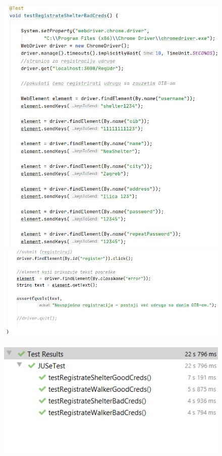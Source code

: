 			 \begin{figure}[H]
			 	\includegraphics[scale=0.75]{slike/Selenium4.1.PNG}
			 	\hspace*{0.1in}
			 	\includegraphics[scale=0.75]{slike/Selenium4.2.PNG} %
			 	\centering
			 \end{figure}
		 
		 
		 	\begin{figure}[H]
		 		\includegraphics[scale=0.75]{slike/SeleniumRezultati.PNG} %
		 		\centering
		 	\end{figure}
		 
